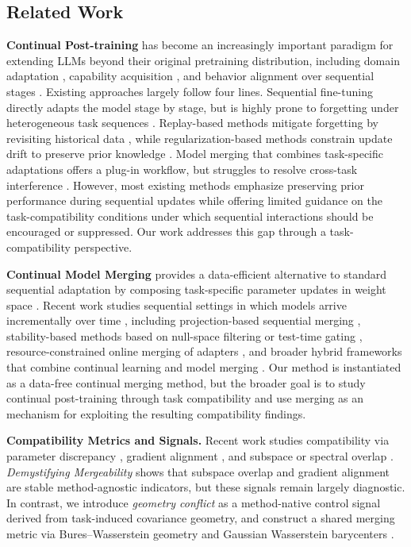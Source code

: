 \documentclass{article}
\begin{document}
\subsection{Related Work}
\textbf{Continual Post-training}
has become an increasingly important paradigm for extending LLMs beyond their original pretraining distribution, including domain adaptation \cite{saad2023udapdr,eschbach2024exploring}, capability acquisition \cite{yin2024enhancing,bansal2024llm}, and behavior alignment over sequential stages \cite{yang2024behavior,ye2026align3gr}. Existing approaches largely follow four lines. Sequential fine-tuning directly adapts the model stage by stage, but is highly prone to forgetting under heterogeneous task sequences \cite{ji2024reversing,qiao2024learn}. Replay-based methods mitigate forgetting by revisiting historical data \cite{zhang2025gere,feng2026forever}, while regularization-based methods constrain update drift to preserve prior knowledge \cite{lu2025controlled,ahn2019uncertainty}. Model merging that combines task-specific adaptations offers a plug-in workflow, but struggles to resolve cross-task interference \cite{zhang2025merge,marczak2024magmax}. 
However, most existing methods emphasize preserving prior performance during sequential updates while offering limited guidance on the task-compatibility conditions under which sequential interactions should be encouraged or suppressed. Our work addresses this gap through a task-compatibility perspective.


\textbf{Continual Model Merging}
provides a data-efficient alternative to standard sequential adaptation by composing task-specific parameter updates in weight space \cite{wang2026mergepipe, yang2026model,zhou2025democratizing}. 
Recent work studies sequential settings in which models arrive incrementally over time \cite{libecame,bui2026mergeslide,zhou2026model}, including projection-based sequential merging \cite{tang2025merging}, stability-based methods based on null-space filtering or test-time gating \cite{qiumingle,qiu2025null}, resource-constrained online merging of adapters \cite{shenaj2025k}, and broader hybrid frameworks that combine continual learning and model merging \cite{phan2025toward}. 
Our method is instantiated as a data-free continual merging method, but the broader goal is to study continual post-training through task compatibility and use merging as an mechanism for exploiting the resulting compatibility findings.


\textbf{Compatibility Metrics and Signals.}
Recent work studies compatibility via parameter discrepancy \cite{ke2025demystifying,chen2025coefficients}, gradient alignment \cite{wei2025modeling}, and subspace or spectral overlap \cite{marczak2025no,tammerging}. 
\emph{Demystifying Mergeability} \cite{ke2025demystifying} shows that subspace overlap and gradient alignment are stable method-agnostic indicators, but these signals remain largely diagnostic. 
In contrast, we introduce \emph{geometry conflict} as a method-native control signal derived from task-induced covariance geometry, and construct a shared merging metric via Bures--Wasserstein geometry \cite{bhatia2019bures} and Gaussian Wasserstein barycenters \cite{alvarez2016fixed}.
\end{document}
